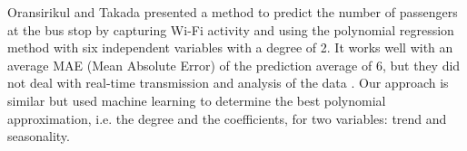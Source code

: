 Oransirikul and Takada presented a method to predict the number of passengers at the bus stop by capturing Wi-Fi activity and using the polynomial regression method with six independent variables with a degree of 2. It works well with an average MAE (Mean Absolute Error) of the prediction average of 6, but they did not deal with real-time transmission and analysis of the data \cite{oransirikul2019practicability}.
Our approach is similar but used machine learning to determine the best polynomial approximation, i.e. the degree and the coefficients, for two variables: trend and seasonality.

